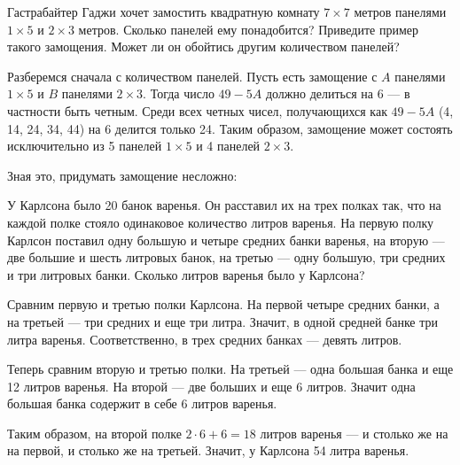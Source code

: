 ﻿


\begin{itemize}

\itB Гастрабайтер Гаджи хочет замостить квадратную комнату $7 \times 7$ метров панелями $1 \times 5$ и $2 \times 3$ метров. Сколько панелей ему понадобится? Приведите пример такого замощения. Может ли он обойтись другим количеством панелей?

\itr Разберемся сначала с количеством панелей. Пусть есть замощение с $A$ панелями $1 \times 5$ и $B$ панелями $2 \times 3$. Тогда число $49 - 5A$ должно делиться на 6 — в частности быть четным. Среди всех четных чисел, получающихся как $49 - 5A$ (4, 14, 24, 34, 44) на 6 делится только 24. Таким образом, замощение может состоять исключительно из 5 панелей $1 \times 5$ и 4 панелей $2 \times 3$.

Зная это, придумать замощение несложно:

	\medskip
	\begin{center}  \end{center}

\itC У Карлсона было 20 банок варенья. Он расставил их на трех полках так, что на каждой полке стояло одинаковое количество литров варенья. На первую полку Карлсон поставил одну большую и четыре средних банки варенья, на вторую — две большие и шесть литровых банок, на третью — одну большую, три средних и три литровых банки. Сколько литров варенья было у Карлсона?

\itr Сравним первую и третью полки Карлсона. На первой четыре средних банки, а на третьей — три средних и еще три литра. Значит, в одной средней банке три литра варенья. Соответственно, в трех средних банках — девять литров.

Теперь сравним вторую и третью полки. На третьей — одна большая банка и еще 12 литров варенья. На второй — две больших и еще 6 литров. Значит одна большая банка содержит в себе 6 литров варенья.

Таким образом, на второй полке $2 \cdot 6 + 6 = 18$ литров варенья — и столько же на на первой, и столько же на третьей. Значит, у Карлсона 54 литра варенья.
\bigbreak\noindent

\end{itemize}

